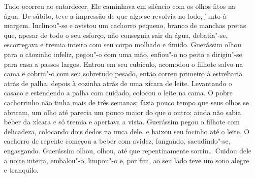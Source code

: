 Tudo ocorreu ao entardecer. Ele caminhava em silêncio com os olhos fitos
na água. De súbito, teve a impressão de que algo se revolvia no lodo,
junto à margem. Inclinou"-se e avistou um cachorro pequeno, branco de
manchas pretas que, apesar de todo o seu esforço, não conseguia sair da
água, debatia"-se, escorregava e tremia inteiro com seu corpo molhado e
úmido. Guerássim olhou para o cãozinho infeliz, pegou"-o com uma mão,
enfiou"-o no peito e dirigiu"-se para casa a passos largos. Entrou em seu
cubículo, acomodou o filhote salvo na cama e cobriu"-o com seu sobretudo
pesado, então correu primeiro à estrebaria atrás de palha, depois à
cozinha atrás de uma xícara de leite. Levantando o casaco e estendendo a
palha com cuidado, colocou o leite na cama. O pobre cachorrinho não
tinha mais de três semanas; fazia pouco tempo que seus olhos se abriram,
um olho até parecia um pouco maior do que o outro; ainda não sabia beber
da xícara e só tremia e apertava a vista. Guerássim pegou o filhote com
delicadeza, colocando dois dedos na nuca dele, e baixou seu focinho até
o leite. O cachorro de repente começou a beber com avidez, fungando,
sacudindo"-se, engasgando. Guerássim olhou, olhou, até que repentinamente
sorriu\ldots{} Cuidou dele a noite inteira, embalou"-o, limpou"-o e, por fim,
ao seu lado teve um sono alegre e tranquilo.

